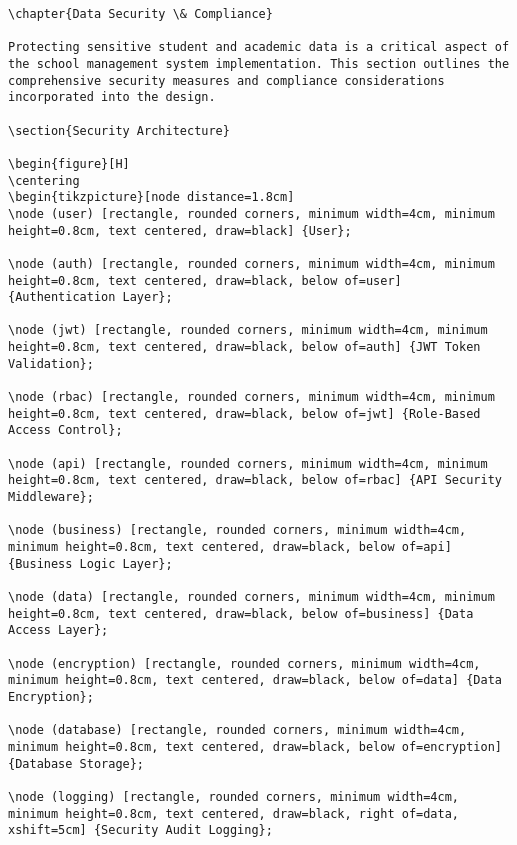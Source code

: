 \documentclass[11pt]{report}
\begin{document}
\begin{verbatim}
\chapter{Data Security \& Compliance}

Protecting sensitive student and academic data is a critical aspect of the school management system implementation. This section outlines the comprehensive security measures and compliance considerations incorporated into the design.

\section{Security Architecture}

\begin{figure}[H]
\centering
\begin{tikzpicture}[node distance=1.8cm]
\node (user) [rectangle, rounded corners, minimum width=4cm, minimum height=0.8cm, text centered, draw=black] {User};

\node (auth) [rectangle, rounded corners, minimum width=4cm, minimum height=0.8cm, text centered, draw=black, below of=user] {Authentication Layer};

\node (jwt) [rectangle, rounded corners, minimum width=4cm, minimum height=0.8cm, text centered, draw=black, below of=auth] {JWT Token Validation};

\node (rbac) [rectangle, rounded corners, minimum width=4cm, minimum height=0.8cm, text centered, draw=black, below of=jwt] {Role-Based Access Control};

\node (api) [rectangle, rounded corners, minimum width=4cm, minimum height=0.8cm, text centered, draw=black, below of=rbac] {API Security Middleware};

\node (business) [rectangle, rounded corners, minimum width=4cm, minimum height=0.8cm, text centered, draw=black, below of=api] {Business Logic Layer};

\node (data) [rectangle, rounded corners, minimum width=4cm, minimum height=0.8cm, text centered, draw=black, below of=business] {Data Access Layer};

\node (encryption) [rectangle, rounded corners, minimum width=4cm, minimum height=0.8cm, text centered, draw=black, below of=data] {Data Encryption};

\node (database) [rectangle, rounded corners, minimum width=4cm, minimum height=0.8cm, text centered, draw=black, below of=encryption] {Database Storage};

\node (logging) [rectangle, rounded corners, minimum width=4cm, minimum height=0.8cm, text centered, draw=black, right of=data, xshift=5cm] {Security Audit Logging};


\end{verbatim}
\end{document}
